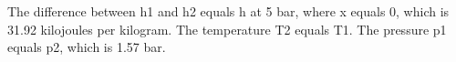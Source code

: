 The difference between h1 and h2 equals h at 5 bar, where x equals 0, which is 31.92 kilojoules per kilogram. The temperature T2 equals T1. The pressure p1 equals p2, which is 1.57 bar.